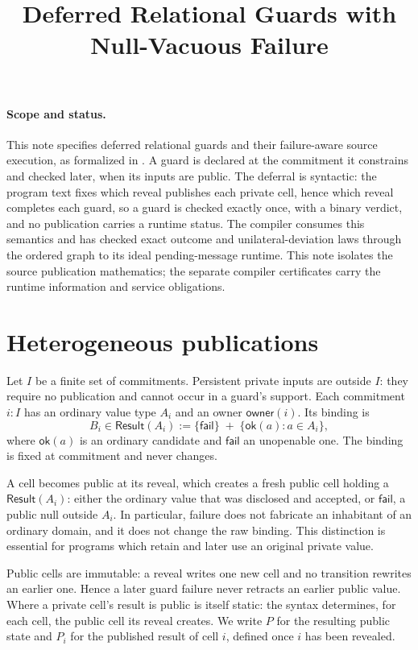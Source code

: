 \documentclass[11pt]{article}
\title{Deferred Relational Guards with Null-Vacuous Failure}
\author{}
\date{}
\newcommand{\Failed}{\mathsf{fail}}
\newcommand{\Value}{\mathsf{ok}}
\newcommand{\owner}{\mathsf{owner}}
\newcommand{\lean}[1]{\texttt{\detokenize{#1}}}
\begin{document}
\maketitle

\paragraph{Scope and status.}
This note specifies deferred relational guards and their failure-aware source
execution, as formalized in \lean{Vegas.Source}. A guard is declared at the
commitment it constrains and checked later, when its inputs are public. The
deferral is syntactic: the program text fixes which reveal publishes each
private cell, hence which reveal completes each guard, so a guard is checked
exactly once, with a binary verdict, and no publication carries a runtime
status. The compiler consumes this \lean{SourceProgram} semantics and has
checked exact outcome and unilateral-deviation laws through the ordered graph
to its ideal pending-message runtime. This note isolates the source
publication mathematics; the separate compiler certificates carry the runtime
information and service obligations.

\section{Heterogeneous publications}
\label{sec:publications}

Let $I$ be a finite set of commitments. Persistent private inputs are outside
$I$: they require no publication and cannot occur in a guard's support.
Each commitment $i:I$ has an ordinary
value type $A_i$ and an owner $\owner(i)$.  Its binding is
\[
  B_i \in \mathsf{Result}(A_i)
      := \{\Failed\}\;\mathbin{+}\;\{\Value(a):a\in A_i\},
\]
where $\Value(a)$ is an ordinary candidate and $\Failed$ an unopenable one.
The binding is fixed at commitment and never changes.

A cell becomes public at its reveal, which creates a fresh public cell holding
a $\mathsf{Result}(A_i)$: either the ordinary value that was disclosed and
accepted, or $\Failed$, a public null outside $A_i$.  In particular, failure
does not fabricate an inhabitant of an ordinary domain, and it does not change
the raw binding.  This distinction is essential for programs which retain and
later use an original private value.

Public cells are immutable: a reveal writes one new cell and no transition
rewrites an earlier one.  Hence a later guard failure never retracts an earlier
public value.  Where a private cell's result is public is itself static: the
syntax determines, for each cell, the public cell its reveal creates.  We write
$P$ for the resulting public state and $P_i$ for the published result of cell
$i$, defined once $i$ has been revealed.
\end{document}
